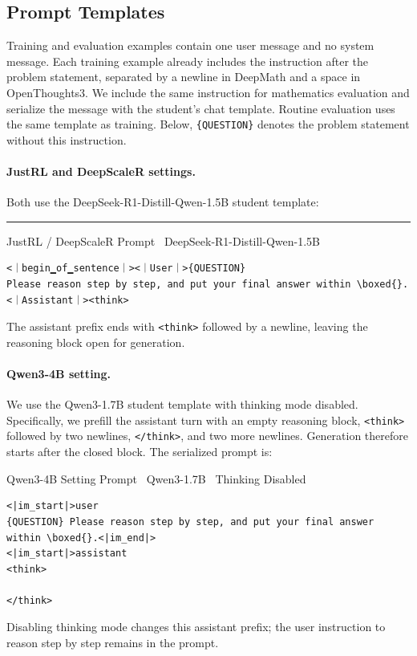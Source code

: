 \subsection{Prompt Templates}
\label{app:prompts}

Training and evaluation examples contain one user message and no system
message. Each training example already includes the instruction
\texttt{}
after the problem statement, separated by a newline in DeepMath and a space
in OpenThoughts3. We include the same instruction for mathematics evaluation
and serialize the message with the student's chat template. Routine
evaluation uses the same template as training. Below, \texttt{\{QUESTION\}}
denotes the problem statement without this instruction.

\paragraph{JustRL and DeepScaleR settings.}
Both use the DeepSeek-R1-Distill-Qwen-1.5B student template:
\begingroup
\expandafter\def\csname u8:｜\endcsname{\textbar}
\expandafter\def\csname u8:▁\endcsname{\rule{0.5em}{0.4pt}}
\begin{promptbox}{JustRL / DeepScaleR Prompt \textbar\ DeepSeek-R1-Distill-Qwen-1.5B}
\fontsize{7}{9}\selectfont
\begin{verbatim}
<｜begin▁of▁sentence｜><｜User｜>{QUESTION}
Please reason step by step, and put your final answer within \boxed{}.<｜Assistant｜><think>
\end{verbatim}
\end{promptbox}
\endgroup
The assistant prefix ends with \texttt{<think>} followed by a newline,
leaving the reasoning block open for generation.

\begin{samepage}
\paragraph{Qwen3-4B setting.}
We use the Qwen3-1.7B student template with thinking mode disabled.
Specifically, we prefill the assistant turn with an empty reasoning block,
\texttt{<think>} followed by two newlines, \texttt{</think>}, and two more
newlines. Generation therefore starts after the closed block. The serialized
prompt is:
\begin{promptbox}{Qwen3-4B Setting Prompt \textbar\ Qwen3-1.7B \textbar\ Thinking Disabled}
\fontsize{7}{9}\selectfont
\begin{verbatim}
<|im_start|>user
{QUESTION} Please reason step by step, and put your final answer within \boxed{}.<|im_end|>
<|im_start|>assistant
<think>

</think>

\end{verbatim}
\end{promptbox}
Disabling thinking mode changes this assistant prefix; the user instruction
to reason step by step remains in the prompt.
\end{samepage}

